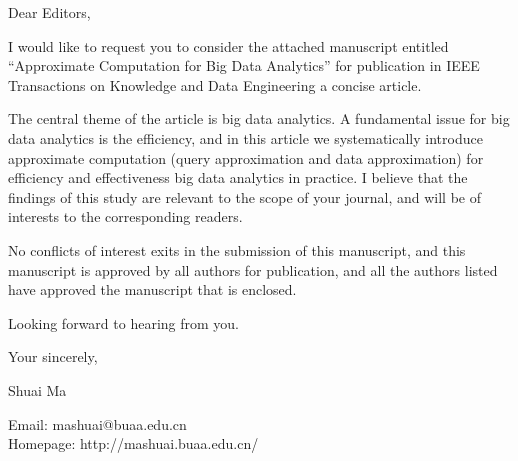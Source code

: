 \documentclass{letter}
\begin{document}
Dear Editors,

I would like to request you to consider the attached manuscript entitled ``Approximate Computation for Big Data Analytics'' for publication in IEEE Transactions on Knowledge and Data Engineering a concise article.


The central theme of the article is big data analytics. A fundamental issue for big data analytics is the efficiency, and in this article we systematically introduce approximate computation (query approximation and data approximation) for efficiency and effectiveness big data analytics in practice.
I believe that the findings of this study are relevant to the scope of your journal, and will be of interests to the corresponding readers.

No conflicts of interest exits in the submission of this manuscript, and this manuscript is approved by all authors for publication, and  all the authors listed have approved the manuscript that is enclosed.

Looking forward to hearing from you.


Your sincerely,

Shuai Ma


Email: mashuai@buaa.edu.cn\\
Homepage: http://mashuai.buaa.edu.cn/
\end{document}
